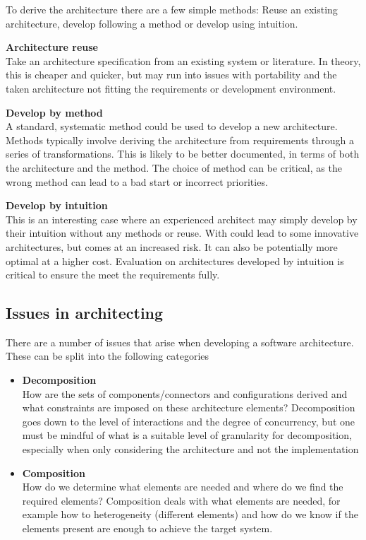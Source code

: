 \documentclass{sty/SizheArticle}
\begin{document}
To derive the architecture there are a few simple methods:
Reuse an existing architecture, develop following a method
or develop using intuition.

\textbf{Architecture reuse} \\
Take an architecture specification from an existing system
or literature. In theory, this is cheaper and quicker, but may
run into issues with portability and the taken architecture
not fitting the requirements or development environment.

\textbf{Develop by method} \\
A standard, systematic method could be used to develop a new
architecture. Methods typically involve deriving the architecture
from requirements through a series of transformations.
This is likely to be better documented, in terms
of both the architecture and the method. The choice of method
can be critical, as the wrong method can lead to a bad start
or incorrect priorities.

\textbf{Develop by intuition} \\
This is an interesting case where an experienced architect may
simply develop by their intuition without any methods or reuse.
With could lead to some innovative architectures, but comes at
an increased risk. It can also be potentially more optimal at a
higher cost. Evaluation on architectures developed by intuition
is critical to ensure the meet the requirements fully.

\subsection{Issues in architecting}
There are a number of issues that arise when developing a software
architecture. These can be split into the following categories
\begin{itemize}
\item \textbf{Decomposition} \\
  How are the sets of components/connectors and configurations
  derived and what constraints are imposed on these architecture
  elements? Decomposition goes down to the level of interactions
  and the degree of concurrency, but one must be mindful of what
  is a suitable level of granularity for decomposition, especially
  when only considering the architecture and not the implementation
\item \textbf{Composition} \\
  How do we determine what elements are needed and where do we find the
  required elements? Composition deals with what elements are needed,
  for example how to heterogeneity (different elements) and how do we
  know if the elements present are enough to achieve the target system.
\end{itemize}
\end{document}
